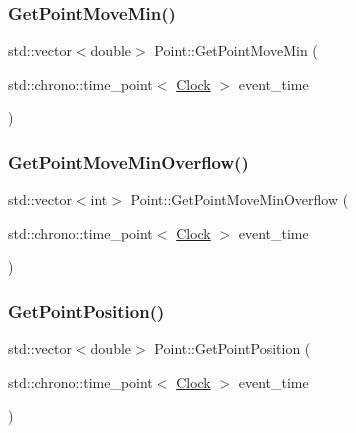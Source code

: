 \mbox{\label{classPoint_a92d41c8cd9a07ef56223839a44f54fe8}} 
\subsubsection{\texorpdfstring{Get\+Point\+Move\+Min()}{GetPointMoveMin()}}
{\footnotesize\ttfamily std\+::vector$<$double$>$ Point\+::\+Get\+Point\+Move\+Min (\begin{DoxyParamCaption}\item[{std\+::chrono\+::time\+\_\+point$<$ \mbox{\hyperlink{universe_8h_a0ef8d951d1ca5ab3cfaf7ab4c7a6fd80}{Clock}} $>$}]{event\+\_\+time }\end{DoxyParamCaption})\hspace{0.3cm}{\ttfamily [inline]}}

\mbox{\label{classPoint_a3c88bb9f80535e98fb0f479b69f75c64}} 
\subsubsection{\texorpdfstring{Get\+Point\+Move\+Min\+Overflow()}{GetPointMoveMinOverflow()}}
{\footnotesize\ttfamily std\+::vector$<$int$>$ Point\+::\+Get\+Point\+Move\+Min\+Overflow (\begin{DoxyParamCaption}\item[{std\+::chrono\+::time\+\_\+point$<$ \mbox{\hyperlink{universe_8h_a0ef8d951d1ca5ab3cfaf7ab4c7a6fd80}{Clock}} $>$}]{event\+\_\+time }\end{DoxyParamCaption})\hspace{0.3cm}{\ttfamily [inline]}}

\mbox{\label{classPoint_a521d229550d7f38851f9ffb1933046a6}} 
\subsubsection{\texorpdfstring{Get\+Point\+Position()}{GetPointPosition()}}
{\footnotesize\ttfamily std\+::vector$<$double$>$ Point\+::\+Get\+Point\+Position (\begin{DoxyParamCaption}\item[{std\+::chrono\+::time\+\_\+point$<$ \mbox{\hyperlink{universe_8h_a0ef8d951d1ca5ab3cfaf7ab4c7a6fd80}{Clock}} $>$}]{event\+\_\+time }\end{DoxyParamCaption})\hspace{0.3cm}{\ttfamily [inline]}}

